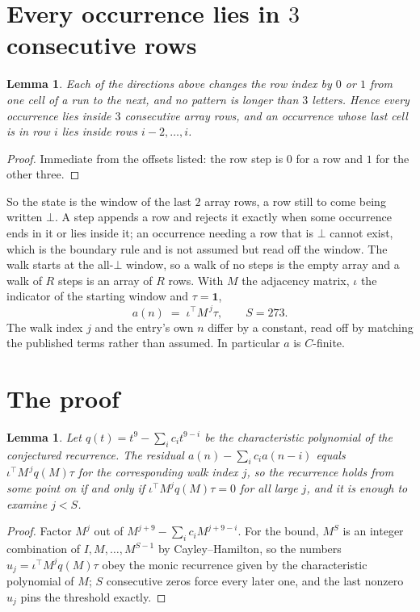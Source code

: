 \documentclass[11pt,a4paper]{article}
\theoremstyle{plain}
\newtheorem{lemma}[theorem]{Lemma}
\theoremstyle{definition}
\begin{document}
\section{Every occurrence lies in $3$ consecutive rows}

\begin{lemma}\label{lem:win}
Each of the directions above changes the row index by $0$ or $1$ from one cell of a run to the
next, and no pattern is longer than $3$ letters. Hence every occurrence lies inside $3$
consecutive array rows, and an occurrence whose last cell is in row $i$ lies inside rows
$i-2,\dots,i$.
\end{lemma}

\begin{proof}
Immediate from the offsets listed: the row step is $0$ for a row and $1$ for the other three.
\end{proof}

So the state is the window of the last $2$ array rows, a row still to come being written
$\bot$. A step appends a row and rejects it exactly when some occurrence ends in it or lies
inside it; an occurrence needing a row that is $\bot$ cannot exist, which is the boundary rule
and is not assumed but read off the window. The walk starts at the all-$\bot$ window, so a walk
of no steps is the empty array and a walk of $R$ steps is an array of $R$ rows. With $M$ the
adjacency matrix, $\iota$ the indicator of the starting window and $\tau=\mathbf{1}$,
\[
a(n)\;=\;\iota^{\!\top}M^{\,j}\tau ,\qquad S=273.
\]
The walk index $j$ and the entry's own $n$ differ by a constant, read off by matching the
published terms rather than assumed. In particular $a$ is $C$-finite.

\section{The proof}

\begin{lemma}\label{lem:crit}
Let $q(t)=t^{9}-\sum_i c_it^{9-i}$ be the characteristic polynomial of the
conjectured recurrence. The residual $a(n)-\sum_ic_ia(n-i)$ equals
$\iota^{\!\top}M^{\,j}q(M)\tau$ for the corresponding walk index $j$, so the recurrence
holds from some point on if and only if $\iota^{\!\top}M^{j}q(M)\tau=0$ for all large $j$,
and it is enough to examine $j<S$.
\end{lemma}

\begin{proof}
Factor $M^{j}$ out of $M^{j+9}-\sum_ic_iM^{j+9-i}$. For the bound, $M^{S}$
is an integer combination of $I,M,\dots,M^{S-1}$ by Cayley--Hamilton, so the numbers
$u_j=\iota^{\!\top}M^{j}q(M)\tau$ obey the monic recurrence given by the characteristic
polynomial of $M$; $S$ consecutive zeros force every later one, and the last nonzero $u_j$
pins the threshold exactly.
\end{proof}
\end{document}

